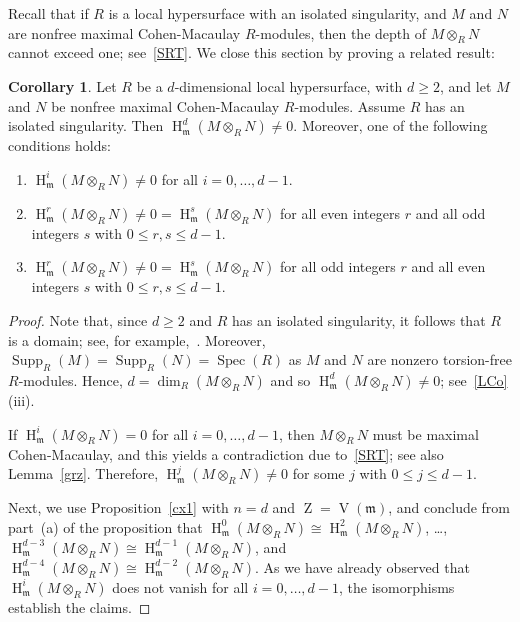 \documentclass[11pt]{amsart}
\theoremstyle{definition}
\newtheorem{cor}[thm]{Corollary}
\theoremstyle{definition}
\numberwithin{equation}{section}
\newcommand{\fm}{\mathfrak{m}}
\DeclareMathOperator{\V}{V}
\DeclareMathOperator{\mz}{Z}
\DeclareMathOperator{\hh}{H}
\DeclareMathOperator{\Supp}{Supp}
\DeclareMathOperator{\Spec}{Spec}
\begin{document}
Recall that if $R$ is a local hypersurface with an isolated singularity, and $M$ and $N$ are nonfree maximal Cohen-Macaulay $R$-modules, then the depth of $M\otimes_RN$ cannot exceed one; see~\ref{SRT}. We close this section by proving a related result: 

\begin{cor}\label{hhyper} Let $R$ be a $d$-dimensional local hypersurface, with $d\geq 2$, and let $M$ and $N$ be nonfree maximal Cohen-Macaulay $R$-modules. Assume $R$ has an isolated singularity. Then $\hh^d_{\fm}(M\otimes_RN)\neq 0$. Moreover, one of the following conditions holds:
\begin{enumerate}[\rm(i)]
\item $\hh^i_{\fm}(M\otimes_RN)\neq 0$ for all $i=0, \ldots, d-1$. 
\item $\hh^r_{\fm}(M\otimes_RN)\neq 0=\hh^s_{\fm}(M\otimes_RN)$ for all even integers $r$ and all odd integers $s$ with $0\leq r, s\leq d-1$.
\item $\hh^r_{\fm}(M\otimes_RN)\neq 0=\hh^s_{\fm}(M\otimes_RN)$ for all odd integers $r$ and all even integers $s$ with $0\leq r, s\leq d-1$.
\end{enumerate}	
\end{cor}

\begin{proof} Note that, since $d\geq 2$ and $R$ has an isolated singularity, it follows that $R$ is a domain; see, for example,~\cite[23.8]{Mat}. Moreover, $\Supp_R(M)=\Supp_R(N)=\Spec(R)$ as $M$ and $N$ are nonzero torsion-free $R$-modules. Hence, $d=\dim_R(M\otimes_RN)$ and so $\hh^d_{\fm}(M\otimes_RN)\neq 0$; see~\ref{LCo}(iii).

If $\hh^i_{\fm}(M\otimes_RN)=0$ for all $i=0, \ldots, d-1$, then $M\otimes_RN$ must be maximal Cohen-Macaulay, and this yields a contradiction due to~\ref{SRT}; see also Lemma~\ref{grz}. Therefore, $\hh^j_{\fm}(M\otimes_RN)\neq 0$ for some $j$ with $0\leq j \leq d-1$.

Next, we use Proposition~\ref{cx1} with $n=d$ and $\mz=\V(\fm)$, and conclude from part~(a) of the proposition that $\hh^0_{\fm}(M\otimes_RN) \cong \hh^2_{\fm}(M\otimes_RN)$, \ldots, $\hh^{d-3}_{\fm}(M\otimes_RN) \cong \hh^{d-1}_{\fm}(M\otimes_RN)$, and $\hh^{d-4}_{\fm}(M\otimes_RN) \cong \hh^{d-2}_{\fm}(M\otimes_RN)$. As we have already observed that $\hh^i_{\fm}(M\otimes_RN)$ does not vanish for all $i=0, \ldots, d-1$, the isomorphisms establish the claims.
\end{proof}

\end{document}
